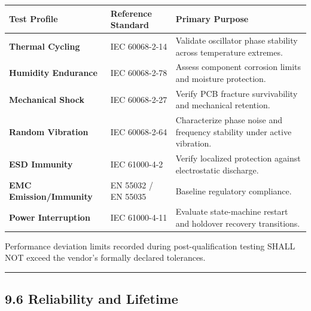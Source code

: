 {\def\LTcaptype{none} %
\begin{longtable}[]{@{}
  >{\raggedright\arraybackslash}p{}
  >{\raggedright\arraybackslash}p{}
  >{\raggedright\arraybackslash}p{}@{}}
\toprule\noalign{}
\begin{minipage}[b]{\linewidth}\raggedright
Test Profile
\end{minipage} & \begin{minipage}[b]{\linewidth}\raggedright
Reference Standard
\end{minipage} & \begin{minipage}[b]{\linewidth}\raggedright
Primary Purpose
\end{minipage} \\
\midrule\noalign{}
\endhead
\bottomrule\noalign{}
\endlastfoot
\textbf{Thermal Cycling} & IEC 60068-2-14 & Validate oscillator phase
stability across temperature extremes. \\
\textbf{Humidity Endurance} & IEC 60068-2-78 & Assess component
corrosion limits and moisture protection. \\
\textbf{Mechanical Shock} & IEC 60068-2-27 & Verify PCB fracture
survivability and mechanical retention. \\
\textbf{Random Vibration} & IEC 60068-2-64 & Characterize phase noise
and frequency stability under active vibration. \\
\textbf{ESD Immunity} & IEC 61000-4-2 & Verify localized protection
against electrostatic discharge. \\
\textbf{EMC Emission/Immunity} & EN 55032 / EN 55035 & Baseline
regulatory compliance. \\
\textbf{Power Interruption} & IEC 61000-4-11 & Evaluate state-machine
restart and holdover recovery transitions. \\
\end{longtable}
}

Performance deviation limits recorded during post-qualification testing
SHALL NOT exceed the vendor's formally declared tolerances.

\begin{center}\rule{0.5\linewidth}{0.5pt}\end{center}

\subsection{9.6 Reliability and
Lifetime}\label{reliability-and-lifetime}

